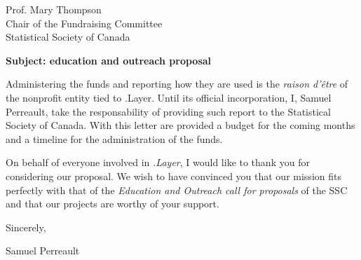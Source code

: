 \documentclass[11pt, a4paper]{letter} %
\begin{document}
\begin{letter}{
	Prof. Mary Thompson\\
	Chair of the Fundraising Committee\\
	Statistical Society of Canada
	
	\bigskip
	\textbf{Subject: education and outreach proposal}%
}
Administering the funds and reporting how they are used is the \emph{raison d'\^{e}tre} of the nonprofit entity tied to .Layer. Until its official incorporation, I, Samuel Perreault, take the responsability of providing such report to the Statistical Society of Canada. With this letter are provided a budget for the coming months and a timeline for the administration of the funds.

\bigskip

On behalf of everyone involved in \emph{.Layer}, I would like to thank you for considering our proposal. We wish to have convinced you that our mission fits perfectly with that of the \emph{Education and Outreach call for proposals} of the SSC and that our projects are worthy of your support.

\closing{Sincerely,}

\noindent Samuel Perreault




\end{letter}
\end{document}
